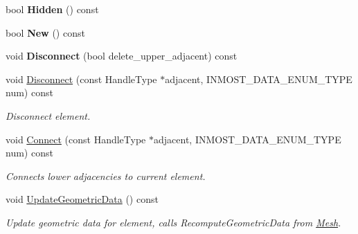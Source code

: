 \begin{DoxyCompactItemize}
\item 
\hypertarget{classINMOST_1_1Element_a47104b37b08a694ec9da21a4e0a158eb}{bool {\bfseries Hidden} () const }\label{classINMOST_1_1Element_a47104b37b08a694ec9da21a4e0a158eb}

\item 
\hypertarget{classINMOST_1_1Element_ad4f1593d17c29484b3b6d72cc17a76ba}{bool {\bfseries New} () const }\label{classINMOST_1_1Element_ad4f1593d17c29484b3b6d72cc17a76ba}

\item 
\hypertarget{classINMOST_1_1Element_a1472c6e7f2e52366dedba12c6138bc17}{void {\bfseries Disconnect} (bool delete\-\_\-upper\-\_\-adjacent) const }\label{classINMOST_1_1Element_a1472c6e7f2e52366dedba12c6138bc17}

\item 
void \hyperlink{classINMOST_1_1Element_a1fdc3e5b00005d5831bb62222823a737}{Disconnect} (const Handle\-Type $\ast$adjacent, I\-N\-M\-O\-S\-T\-\_\-\-D\-A\-T\-A\-\_\-\-E\-N\-U\-M\-\_\-\-T\-Y\-P\-E num) const 
\begin{DoxyCompactList}\small\item\em Disconnect element. \end{DoxyCompactList}\item 
void \hyperlink{classINMOST_1_1Element_a96bd136b0f249c958fc8632553aa3b58}{Connect} (const Handle\-Type $\ast$adjacent, I\-N\-M\-O\-S\-T\-\_\-\-D\-A\-T\-A\-\_\-\-E\-N\-U\-M\-\_\-\-T\-Y\-P\-E num) const 
\begin{DoxyCompactList}\small\item\em Connects lower adjacencies to current element. \end{DoxyCompactList}\item 
\hypertarget{classINMOST_1_1Element_ad226d6f51de0ee33111fa2d9ee77e2ce}{void \hyperlink{classINMOST_1_1Element_ad226d6f51de0ee33111fa2d9ee77e2ce}{Update\-Geometric\-Data} () const }\label{classINMOST_1_1Element_ad226d6f51de0ee33111fa2d9ee77e2ce}

\begin{DoxyCompactList}\small\item\em Update geometric data for element, calls Recompute\-Geometric\-Data from \hyperlink{classINMOST_1_1Mesh}{Mesh}. \end{DoxyCompactList}\end{DoxyCompactItemize}
